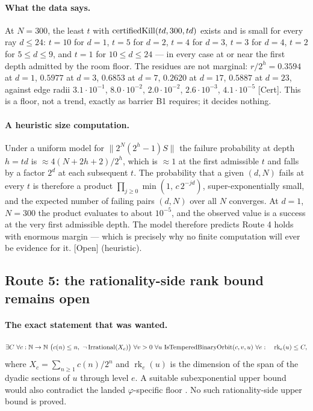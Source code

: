 \documentclass[11pt]{article}
\theoremstyle{plain}
\theoremstyle{definition}
\theoremstyle{remark}
\newcommand{\lean}[2]{\leanlink{#2}}
\let\origmathrm\mathrm
\renewcommand{\mathrm}[1]{\ifmmode\origmathrm{#1}\else\textrm{#1}\fi}%
\newcommand{\ev}[1]{{\small\textsf{[#1]}}\xspace}
\newcommand{\N}{\mathbb{N}}
\begin{document}
\paragraph{What the data says.}
At $N=300$, the least $t$ with $\mathrm{certifiedKill}(td,300,td)$ exists
and is small for every ray $d\le 24$: $t=10$ for $d=1$, $t=5$ for $d=2$,
$t=4$ for $d=3$, $t=3$ for $d=4$, $t=2$ for $5\le d\le 9$, and $t=1$ for
$10\le d\le 24$ --- in every case at or near the first depth admitted by the
room floor. The residues are not marginal: $r/2^{h}=0.3594$ at $d=1$,
$0.5977$ at $d=3$, $0.6853$ at $d=7$, $0.2620$ at $d=17$, $0.5887$ at
$d=23$, against edge radii $3.1\cdot10^{-1}$, $8.0\cdot10^{-2}$,
$2.0\cdot10^{-2}$, $2.6\cdot10^{-3}$, $4.1\cdot10^{-5}$ \ev{Cert}. This is a
floor, not a trend, exactly as barrier B1 requires; it decides nothing.

\paragraph{A heuristic size computation.}
Under a uniform model for $\|2^{N}(2^{h}-1)S\|$ the failure probability at
depth $h=td$ is $\approx 4(N+2h+2)/2^{h}$, which is $\approx 1$ at the first
admissible $t$ and falls by a factor $2^{d}$ at each subsequent $t$. The
probability that a given $(d,N)$ fails at every $t$ is therefore a product
$\prod_{j\ge0}\min(1,\,c\,2^{-jd})$, super-exponentially small, and the
expected number of failing pairs $(d,N)$ over all $N$ converges. At $d=1$,
$N=300$ the product evaluates to about $10^{-5}$, and the observed value is a
success at the very first admissible depth. The model therefore predicts
Route 4 holds with enormous margin --- which is precisely why no finite
computation will ever be evidence for it. \ev{Open} (heuristic).

\subsection{Route 5: the rationality-side rank bound remains open}

\paragraph{The exact statement that was wanted.}
\[
  \exists C\ \forall c:\N\to\N\ \bigl(c(n)\le n,\ \neg\,\mathrm{Irrational}(X_c)\bigr)
  \ \forall v>0\ \forall u\ \mathrm{IsTemperedBinaryOrbit}(c,v,u)\ \forall e:\quad
  \operatorname{rk}_e(u)\le C ,
\]
where $X_c=\sum_{n\ge1}c(n)/2^{n}$ and $\operatorname{rk}_e(u)$ is the
dimension of the span of the dyadic sections of $u$ through level $e$.
A suitable subexponential upper bound would also contradict the landed
$\varphi$-specific floor
\lean{Erdos249257.\allowbreak not_irrational_totientSeries_\allowbreak implies_unbounded_carryRank_unconditional}{TotientCarryKernelRigidity.lean:300}
\quad \ev{Lean}.  No such rationality-side upper bound is proved.
\end{document}
